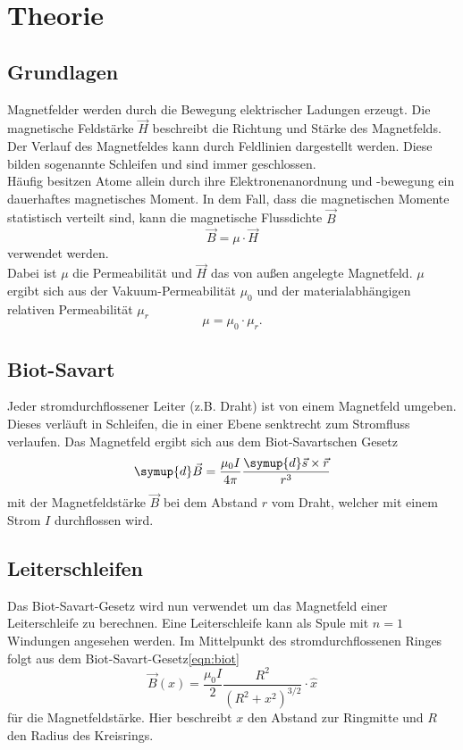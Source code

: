 \section{Theorie}
\label{sec:Theorie}

\subsection{Grundlagen}
Magnetfelder werden durch die Bewegung elektrischer Ladungen erzeugt.
Die magnetische Feldstärke $\vec{H}$ beschreibt die Richtung und Stärke des Magnetfelds.
Der Verlauf des Magnetfeldes kann durch Feldlinien dargestellt werden.
Diese bilden sogenannte Schleifen und sind immer geschlossen.\\
Häufig besitzen Atome allein durch ihre Elektronenanordnung und -bewegung ein dauerhaftes magnetisches Moment.
In dem Fall, dass die magnetischen Momente statistisch verteilt sind, kann die magnetische Flussdichte $\vec{B}$
\begin{equation}
    \vec{B} = \mu \cdot \vec{H}
    \label{eqn:h_zu_b}
\end{equation}
verwendet werden.\\
Dabei ist $\mu$ die Permeabilität und $\vec{H}$ das von außen angelegte Magnetfeld.
$\mu$ ergibt sich aus der Vakuum-Permeabilität $\mu_0$ und der materialabhängigen relativen Permeabilität $\mu_r$
\begin{equation}
    \mu = \mu_0 \cdot \mu_r .
\end{equation}

\subsection{Biot-Savart}
Jeder stromdurchflossener Leiter (z.B. Draht) ist von einem Magnetfeld umgeben. Dieses verläuft in Schleifen, die in einer Ebene
senktrecht zum Stromfluss verlaufen. Das Magnetfeld ergibt sich aus dem Biot-Savartschen Gesetz
\begin{equation}
    \symup{d}\vec{B} = \frac{\mu_0 I}{4\pi} \frac{\symup{d}\vec{s} \times \vec{r}}{r^3}
    \label{eqn:biot}
\end{equation}
mit der Magnetfeldstärke $\vec{B}$ bei dem Abstand $r$ vom Draht, welcher mit einem Strom $I$ durchflossen wird.

\subsection{Leiterschleifen}
Das Biot-Savart-Gesetz wird nun verwendet um das Magnetfeld einer Leiterschleife zu berechnen. Eine Leiterschleife
kann als Spule mit $n=1$ Windungen angesehen werden. Im Mittelpunkt des stromdurchflossenen Ringes folgt aus dem Biot-Savart-Gesetz\eqref{eqn:biot}
\begin{equation}
    \vec{B}(x) = \frac{\mu_0 I}{2} \frac{R^2}{(R^2+x^2)^{3/2}} \cdot \hat{x}
\end{equation}
für die Magnetfeldstärke. Hier beschreibt $x$ den Abstand zur Ringmitte und $R$ den Radius des Kreisrings.  \\

